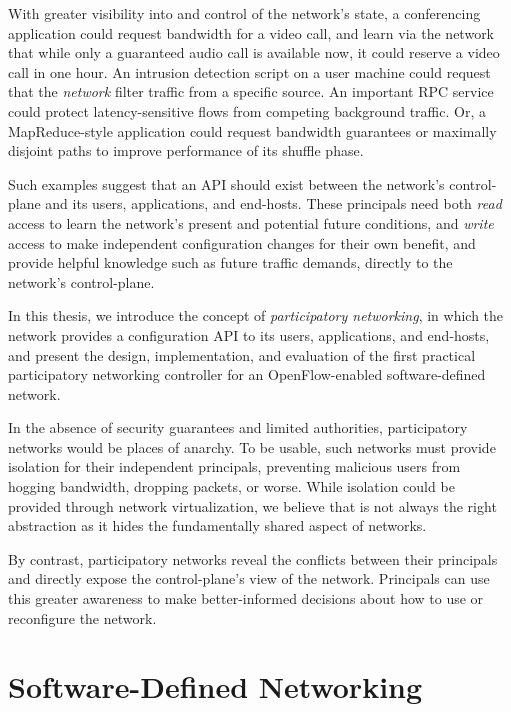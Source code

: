 With greater visibility into and control of the network's state,
a conferencing application could request bandwidth for a video call,
and learn via the network that while only a guaranteed audio call is available
now, it could reserve a video call in one hour.
An intrusion detection script on a user machine could request that the
\emph{network} filter traffic from a specific source.
An important RPC service could protect latency-sensitive flows from competing
background traffic.
Or, a MapReduce-style application could request
bandwidth guarantees or maximally disjoint paths to improve performance of its shuffle phase.

Such examples suggest that an API should exist between the network's
control-plane and its users, applications, and end-hosts. These
principals need both \emph{read} access to learn the network's
present and potential future conditions, and \emph{write} access to
make independent configuration changes for their own benefit, and
provide helpful knowledge such as future traffic demands, directly
to the network's control-plane.

In this thesis, we introduce the concept of \emph{participatory
networking}, in which the network provides
a configuration API to its users, applications, and end-hosts, and
present the design, implementation, and evaluation of the first
practical participatory networking controller for an
OpenFlow-enabled software-defined network.

In the absence of security guarantees and limited authorities,
participatory networks would be places of anarchy. To be usable,
such networks must provide isolation for their independent
principals, preventing malicious users from hogging bandwidth,
dropping packets, or worse. While isolation could be provided
through network virtualization, we believe that is not always the
right abstraction as it hides the fundamentally shared aspect of
networks.  

By contrast, participatory networks reveal the conflicts between
their principals and directly expose the control-plane's view of
the network. Principals can use this greater awareness to make
better-informed decisions about how to use or reconfigure the
network.


\section{Software-Defined Networking}


